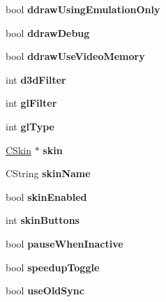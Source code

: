\begin{DoxyCompactItemize}
bool {\bfseries ddraw\+Using\+Emulation\+Only}
\item 
\mbox{\label{class_v_b_a_a28d611a2c3dfc21191a27e8d8239de35}} 
bool {\bfseries ddraw\+Debug}
\item 
\mbox{\label{class_v_b_a_a875d3208513412753e2e946b8d6e6ce3}} 
bool {\bfseries ddraw\+Use\+Video\+Memory}
\item 
\mbox{\label{class_v_b_a_a8563e53b73a28a011e656f6fc8a4e5ff}} 
int {\bfseries d3d\+Filter}
\item 
\mbox{\label{class_v_b_a_a7861cd60864163f310ae87f746eba9e6}} 
int {\bfseries gl\+Filter}
\item 
\mbox{\label{class_v_b_a_afb5faab6c2ddf2661b2fe19f118fd882}} 
int {\bfseries gl\+Type}
\item 
\mbox{\label{class_v_b_a_a2d80d3f19afa58047c05277aa0c18402}} 
\mbox{\hyperlink{class_c_skin}{C\+Skin}} $\ast$ {\bfseries skin}
\item 
\mbox{\label{class_v_b_a_a61c4b5378e8a3a36cf65bf095cca7f47}} 
C\+String {\bfseries skin\+Name}
\item 
\mbox{\label{class_v_b_a_a5cc7dbf58210b127d9e807e8a3262829}} 
bool {\bfseries skin\+Enabled}
\item 
\mbox{\label{class_v_b_a_a18dd81b37aa33a8f580a2dabe358a280}} 
int {\bfseries skin\+Buttons}
\item 
\mbox{\label{class_v_b_a_a77e9763291376839d4c1e5eff00604b5}} 
bool {\bfseries pause\+When\+Inactive}
\item 
\mbox{\label{class_v_b_a_aab299545104f6df869bf8f7abee6ef0a}} 
bool {\bfseries speedup\+Toggle}
\item 
\mbox{\label{class_v_b_a_a8a4b36a4e6259df18baf03360aacad4b}} 
bool {\bfseries use\+Old\+Sync}
\item 
\mbox{\label{class_v_b_a_ad02c13c4fea97781a17ca6c9f9cdaa49}} 

\end{DoxyCompactItemize}
